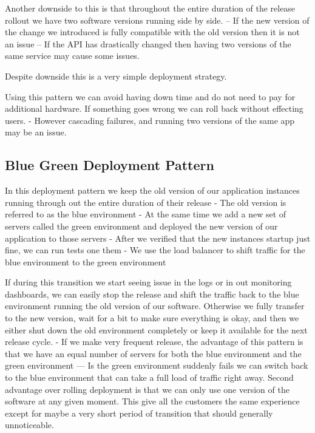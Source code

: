 \documentclass[a4paper, 11pt]{book}
\begin{document}
    Another downside to this is that throughout the entire duration of the release rollout we have two software versions running side by side.
    -- If the new version of the change we introduced is fully compatible with the old version then it is not an issue
    -- If the API has drastically changed then having two versions of the same service may cause some issues.

    Despite downside this is a very simple deployment strategy.

    Using this pattern we can avoid having down time and do not need to pay for additional hardware.
    If something goes wrong we can roll back without effecting users.
    - However cascading failures, and running two versions of the same app may be an issue.

    \subsection{Blue Green Deployment Pattern}
    In this deployment pattern we keep the old version of our application instances running through out the entire duration of their release
    - The old version is referred to as the blue environment
    - At the same time we add a new set of servers called the green environment and deployed the new version of our application to those servers
    - After we verified that the new instances startup just fine, we can run tests one them
    - We use the load balancer to shift traffic for the blue environment to the green environment

    If during this transition we start seeing issue in the logs or in out monitoring dashboards, we can easily stop the release and shift the traffic back to the blue environment running the old version of our software.
    Otherwise we fully transfer to the new version, wait for a bit to make sure everything is okay, and then we either shut down the old environment completely or keep it available for the next release cycle.
    - If we make very frequent release, the advantage of this pattern is that we have an equal number of servers for both the blue environment and the green environment
    --- Is the green environment suddenly fails we can switch back to the blue environment that can take a full load of traffic right away.
    Second advantage over rolling deployment is that we can only use one version of the software at any given moment.
    This give all the customers the same experience except for maybe a very short period of transition that should generally unnoticeable.
\end{document}
